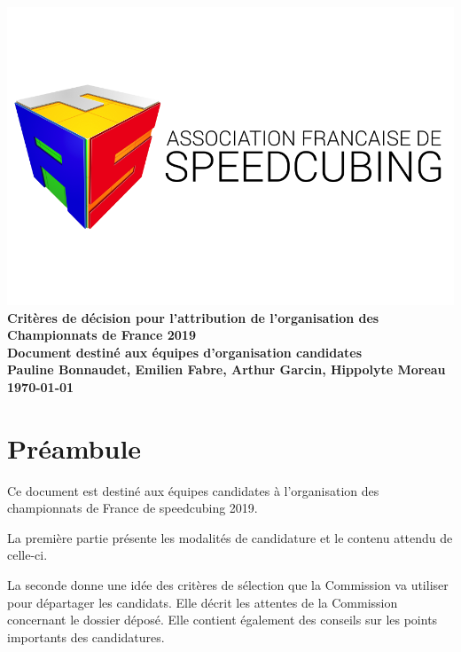 \documentclass[a4paper,12pt]{scrartcl}
\begin{document}
\sloppy

\begin{titlepage}
    \centering
    \vfill
    \includegraphics[width=\textwidth]{logoafsletters.png}
    \vfill
    {\bfseries\Huge
        Critères de décision pour l'attribution de l'organisation des Championnats de France 2019\\
		\vskip1cm
	\large
        Document destiné aux équipes d'organisation candidates\\
        \vskip3cm
        Pauline Bonnaudet, Emilien Fabre, Arthur Garcin, Hippolyte Moreau\\
        \vskip2cm
\today
    }    
    \vfill
\end{titlepage}


\pagebreak


\section*{Préambule}

Ce document est destiné aux équipes candidates à l'organisation des championnats de France
de speedcubing 2019.

La première partie présente les modalités de candidature et le contenu attendu de celle-ci.

La seconde donne une idée des critères de sélection que la Commission va utiliser
pour départager les candidats. Elle décrit les attentes de la Commission concernant
le dossier déposé. Elle contient également des conseils sur les points importants des candidatures.
\end{document}
